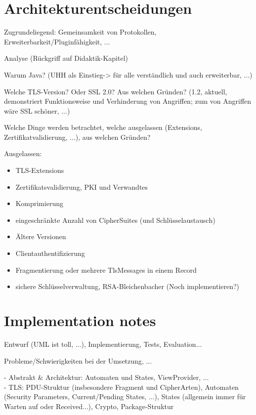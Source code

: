 \section{Architekturentscheidungen}

\begin{mdframed}
Zugrundeliegend: Gemeinsamkeit von Protokollen, Erweiterbarkeit/Pluginfähigkeit, ...

Analyse (Rückgriff auf Didaktik-Kapitel)

Warum Java? (UHH als Einstieg-> für alle verständlich und auch erweiterbar, ...)

\hrulefill{}

Welche TLS-Version? Oder SSL 2.0? Aus welchen Gründen? (1.2, aktuell, demonstriert Funktionsweise und Verhinderung von Angriffen; zum  von Angriffen wäre SSL schöner, ...)

Welche Dinge werden betrachtet, welche ausgelassen (Extensions, Zertifikatvalidierung, ...), aus welchen Gründen?

Ausgelassen:
\begin{itemize}
\item TLS-Extensions
\item Zertifikatsvalidierung, PKI und Verwandtes
\item Komprimierung
\item eingeschränkte Anzahl von CipherSuites (und Schlüsselaustausch)
\item Ältere Versionen
\item Clientauthentifizierung
\item Fragmentierung oder mehrere TlsMessages in einem Record
\item sichere Schlüsselverwaltung, RSA-Bleichenbacher (Noch implementieren?) 
\end{itemize}

\end{mdframed}


\section{Implementation notes}

\begin{mdframed}
Entwurf (UML ist toll,  ...), Implementierung, Tests, Evaluation...

Probleme/Schwierigkeiten bei der Umsetzung, ...

- Abstrakt \& Architektur: Automaten und States, ViewProvider, ...\\
- TLS: PDU-Struktur (insbesondere Fragment und CipherArten), Automaten (Security Parameters, Current/Pending States, ...), States (allgemein immer für Warten auf oder Received...), Crypto, Package-Struktur
\end{mdframed}
